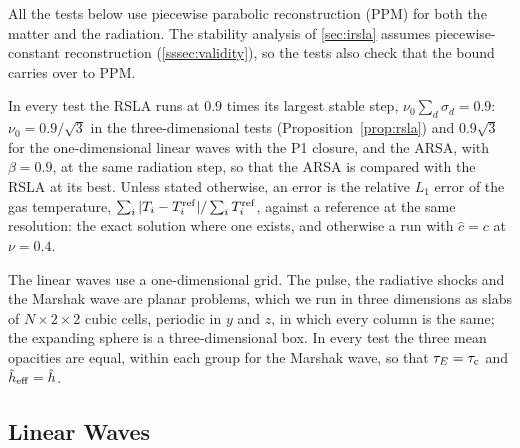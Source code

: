 \documentclass[preprint,12pt,authoryear]{elsarticle}
\begin{document}
All the tests below use piecewise parabolic reconstruction (PPM) for both the matter and the radiation. The stability analysis of \autoref{sec:irsla} assumes piecewise-constant reconstruction (\autoref{sssec:validity}), so the tests also check that the bound carries over to PPM.

In every test the RSLA runs at $0.9$ times its largest stable step, $\nu_0\sum_d\sigma_d = 0.9$: $\nu_0 = 0.9/\sqrt{3}$ in the three-dimensional tests (Proposition~\ref{prop:rsla}) and $0.9\sqrt{3}$ for the one-dimensional linear waves with the P1 closure, and the ARSA, with $\beta = 0.9$, at the same radiation step, so that the ARSA is compared with the RSLA at its best. Unless stated otherwise, an error is the relative $L_1$ error of the gas temperature, $\sum_i |T_i - T_i^{\rm ref}|/\sum_i T_i^{\rm ref}$, against a reference at the same resolution: the exact solution where one exists, and otherwise a run with $\hat{c} = c$ at $\nu = 0.4$.

The linear waves use a one-dimensional grid. The pulse, the radiative shocks and the Marshak wave are planar problems, which we run in three dimensions as slabs of $N \times 2 \times 2$ cubic cells, periodic in $y$ and $z$, in which every column is the same; the expanding sphere is a three-dimensional box. In every test the three mean opacities are equal, within each group for the Marshak wave, so that $\tau_E = \tau_{\rm c}$ and $\hat{h}_{\rm eff} = \hat{h}$.

\subsection{Linear Waves}
\label{ssec:test_waves}
\end{document}
